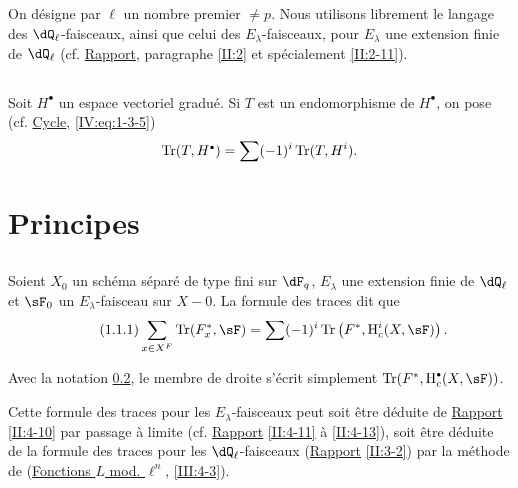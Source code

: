 \subsection{}\label{VI:0-2}

On désigne par $\ell$ un nombre premier $\ne p$. Nous utilisons librement le 
langage des $\dQ_\ell$-faisceaux, ainsi que celui des $E_\lambda$-faisceaux, 
pour $E_\lambda$ une extension finie de $\dQ_\ell$ (cf. \hyperref[II]{Rapport}, 
paragraphe \ref{II:2} et spécialement \ref{II:2-11}). 





\subsection{}\label{VI:0-3}

Soit $H^\bullet$ un espace vectoriel gradué. Si $T$ est un endomorphisme de 
$H^\bullet$, on pose (cf. \hyperref[IV]{Cycle}, \ref{IV:eq:1-3-5}) 
\[
  \tr(T,H^\bullet) = \sum (-1)^i \tr(T,H^i) \text{.}
\]










\section{Principes}\label{VI:1}





\subsection{}\label{VI:1-1}

Soient $X_0$ un schéma séparé de type fini sur $\dF_q$, $E_\lambda$ une 
extension finie de $\dQ_\ell$ et $\sF_0$ un $E_\lambda$-faisceau sur $X-0$. La 
formule des traces dit que 
\begin{equation*}\tag{1.1.1}\label{VI:eq:1-1-1}
  \sum_{x\in X^F} \tr(F_x^\ast,\sF) = \sum (-1)^i \tr\left(F^\ast,\h_c^i(X,\sF)\right) \text{.}
\end{equation*}

Avec la notation \ref{VI:0-3}, le membre de droite s'écrit simplement 
$\tr(F^\ast,\h_c^\bullet(X,\sF))$. 

Cette formule des traces pour les $E_\lambda$-faisceaux peut soit être 
déduite de \hyperref[II]{Rapport} \ref{II:4-10} par passage à limite (cf. 
\hyperref[II]{Rapport} \ref{II:4-11} à \ref{II:4-13}), soit être déduite 
de la formule des traces pour les $\dQ_\ell$-faisceaux (\hyperref[II]{Rapport} 
\ref{II:3-2}) par la méthode de (\hyperref[III]{Fonctions $L$ mod. $\ell^n$}, 
\ref{III:4-3}). 

